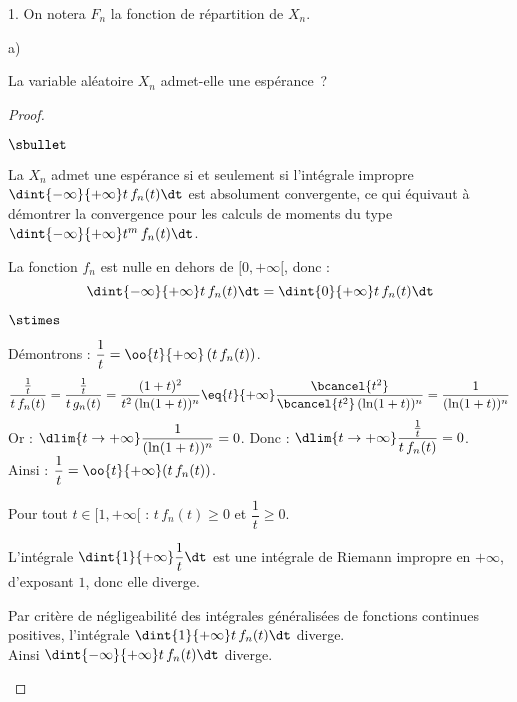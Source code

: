 \documentclass[11pt]{article}%
\begin{document}
\begin{noliste}{1.}
\noindent \hspace{-0.5cm} On notera $F_n$ la fonction de répartition de 
$X_n$.

\begin{noliste}{a)}
\setcounter{enumii}{1}
\item La variable aléatoire $X_n$ admet-elle une espérance~?

\begin{proof}~
 \begin{noliste}{$\sbullet$}
 \item La \var $X_n$ admet une espérance si et seulement si
   l'intégrale impropre $\dint{-\infty}{+\infty} t \, f_n(t) \dt$ est
   absolument convergente, ce qui équivaut à démontrer la convergence
   pour les calculs de moments du type $\dint{-\infty}{+\infty} t^m \,
   f_n(t) \dt$.
  
  \item La fonction $f_n$ est nulle en dehors de $[0,+\infty[$, donc : 
  \[
   \dint{-\infty}{+\infty} t \, f_n(t) \dt = 
   \dint{0}{+\infty} t \, f_n(t) \dt
  \]
  
\item
  \begin{noliste}{$\stimes$}
  \item Démontrons : $\dfrac{1}{t} = \oo{t}{+\infty} \left( t\, f_n(t)
    \right)$.
    \[
     \dfrac{\frac{1}{t}}{t\, f_n(t)} =
     \dfrac{\frac{1}{t}}{t\, g_n(t)}= \dfrac{(1+t)^2}{t^2 \, 
     (\ln(1+t))^n} \eq{t}{+\infty} \dfrac{\bcancel{t^2}}
     {\bcancel{t^2} \, (\ln(1+t))^n} = \dfrac{1}{(\ln(1+t))^n}
    \]
    Or : $\dlim{t\to +\infty} \dfrac{1}{(\ln(1+t))^n} =0$. Donc :
    $\dlim{t\to+\infty} \dfrac{\frac{1}{t}}{t\, f_n(t)}=0$.\\[.2cm]
    Ainsi : $\dfrac{1}{t} = \oo{t}{+\infty} (t\, f_n(t))$.




  \item Pour tout $t\in [1,+\infty[$ : $t\, f_n(t) \geq 0$ et
    $\dfrac{1}{t} \geq 0$.
    
    \item L'intégrale $\dint{1}{+\infty} \dfrac{1}{t} \dt$ est une 
    intégrale de Riemann impropre en $+\infty$, d'exposant $1$, donc 
    elle diverge.
  \end{noliste}
  Par critère de négligeabilité des intégrales généralisées de
  fonctions continues positives, l'intégrale $\dint{1}{+\infty} t\,
  f_n(t) \dt$ diverge.\\[.2cm]
  Ainsi $\dint{-\infty}{+\infty} t \, f_n(t) \dt$ diverge.
 \end{noliste}


\end{proof}
\end{noliste}
\end{noliste}
\end{document}
